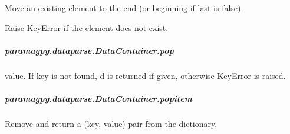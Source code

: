 \documentclass[a4paper,10pt,english,openany,oneside]{sphinxmanual}
\begin{document}
\begin{fulllineitems}
\begin{fulllineitems}
\begin{fulllineitems}
\label{\detokenize{reference/generated/paramagpy.dataparse.DataContainer.move_to_end:paramagpy.dataparse.DataContainer.move_to_end}}
\sphinxAtStartPar
Move an existing element to the end (or beginning if last is false).

\sphinxAtStartPar
Raise KeyError if the element does not exist.

\end{fulllineitems}



\subparagraph{paramagpy.dataparse.DataContainer.pop}
\label{\detokenize{reference/generated/paramagpy.dataparse.DataContainer.pop:paramagpy-dataparse-datacontainer-pop}}\label{\detokenize{reference/generated/paramagpy.dataparse.DataContainer.pop::doc}}

\begin{fulllineitems}
\label{\detokenize{reference/generated/paramagpy.dataparse.DataContainer.pop:paramagpy.dataparse.DataContainer.pop}}
\sphinxAtStartPar
value.  If key is not found, d is returned if given, otherwise KeyError
is raised.

\end{fulllineitems}



\subparagraph{paramagpy.dataparse.DataContainer.popitem}
\label{\detokenize{reference/generated/paramagpy.dataparse.DataContainer.popitem:paramagpy-dataparse-datacontainer-popitem}}\label{\detokenize{reference/generated/paramagpy.dataparse.DataContainer.popitem::doc}}

\begin{fulllineitems}
\label{\detokenize{reference/generated/paramagpy.dataparse.DataContainer.popitem:paramagpy.dataparse.DataContainer.popitem}}
\sphinxAtStartPar
Remove and return a (key, value) pair from the dictionary.


\end{fulllineitems}
\end{fulllineitems}
\end{fulllineitems}
\end{document}
